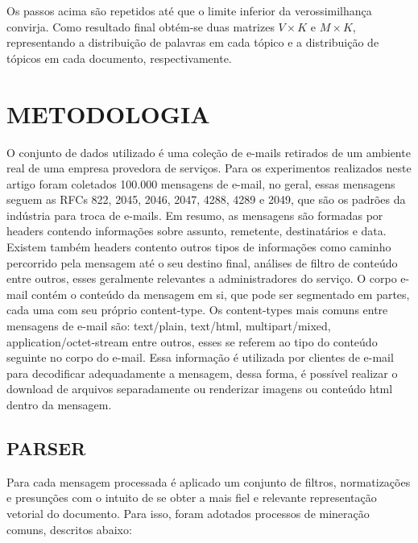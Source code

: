\documentclass[12pt,a4paper]{article}
\begin{document}
  Os passos acima são repetidos até que o limite inferior da verossimilhança convirja. Como resultado final obtém-se duas matrizes $V \times K$ e $M \times K$,
   representando  a distribuição de palavras em cada tópico e a distribuição de tópicos em cada documento, respectivamente.
  
  
  
  \section{METODOLOGIA}
  O conjunto de dados utilizado é uma coleção de e-mails retirados de um ambiente real de uma empresa provedora de serviços. 
   Para os experimentos realizados neste artigo foram coletados 100.000 mensagens de e-mail, no geral, essas mensagens seguem as RFCs 822, 2045, 2046, 2047, 4288, 4289 e 2049,
   que são os padrões da indústria para troca de e-mails.	Em resumo, as mensagens são formadas por headers contendo informações sobre assunto, remetente, destinatários e data.
   Existem também headers contento outros tipos de informações como caminho percorrido pela mensagem até o seu destino final, análises de filtro de conteúdo entre outros,
   esses geralmente relevantes a administradores do serviço. O corpo e-mail contém o conteúdo da mensagem em si, que pode ser segmentado em  partes, cada uma com seu próprio content-type. 
   Os content-types mais comuns entre mensagens de e-mail são: text/plain, text/html, multipart/mixed, application/octet-stream entre outros, esses se referem ao tipo do conteúdo seguinte no corpo do e-mail.
   Essa informação é utilizada por clientes de e-mail para decodificar adequadamente a mensagem,
   dessa forma, é possível realizar o download de arquivos separadamente ou renderizar imagens ou conteúdo html dentro da mensagem.
  
  
  \subsection{PARSER}
  Para cada mensagem processada é aplicado um conjunto de filtros, normatizações e presunções com o intuito de se obter a mais fiel e relevante representação vetorial do documento.
   Para isso, foram adotados processos de mineração comuns, descritos abaixo:
  
\end{document}
